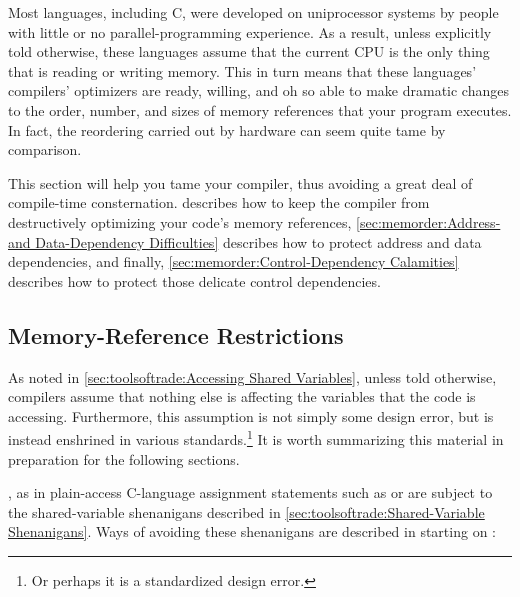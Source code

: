 Most languages, including C, were developed on uniprocessor systems
by people with little or no parallel-programming experience.
As a result, unless explicitly told otherwise, these languages assume
that the current CPU is the only thing that is reading or writing memory.
This in turn means that these languages' compilers' optimizers
are ready, willing, and oh so able to make dramatic changes to the
order, number, and sizes of memory references that your program
executes.
In fact, the reordering carried out by hardware can seem quite tame
by comparison.

This section will help you tame your compiler, thus avoiding a great
deal of compile-time consternation.
describes how to keep the compiler from destructively optimizing
your code's memory references,
\cref{sec:memorder:Address- and Data-Dependency Difficulties}
describes how to protect address and data dependencies,
and finally,
\cref{sec:memorder:Control-Dependency Calamities}
describes how to protect those delicate control dependencies.

\subsection{Memory-Reference Restrictions}
\label{sec:memorder:Memory-Reference Restrictions}

As noted in \cref{sec:toolsoftrade:Accessing Shared Variables},
unless told otherwise, compilers assume that nothing else
is affecting the variables that the code is accessing.
Furthermore, this assumption is not simply some design error, but is
instead enshrined in various standards.\footnote{
	Or perhaps it is a standardized design error.}
It is worth summarizing this material in preparation for the following
sections.

, as in plain-access C-language assignment statements such
as  or  are subject to the
shared-variable shenanigans described in
\cref{sec:toolsoftrade:Shared-Variable Shenanigans}.
Ways of avoiding these shenanigans are described in
starting on
:


